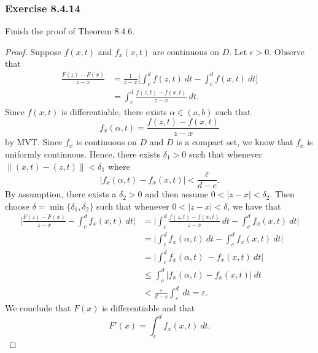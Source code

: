 \subsubsection{Exercise 8.4.14} Finish the proof of Theorem 8.4.6.
\begin{proof}
Suppose \( f(x,t)  \) and \( f_{x}(x,t)  \) are continuous on \( D  \). Let \( \epsilon > 0  \). Observe that 
\begin{align*}
    \frac{ F(z) - F(x)  }{ z - x  }   &=  \frac{ 1 }{ z - x  } \Big[   \int_{ c }^{ d }  f(z,t) \ dt - \int_{ c }^{ d } f(x,t) \ dt \Big]  \\
                 &= \int_{ c }^{ d }  \frac{ f(z,t) - f(x,t)  }{ z - x  }  \  dt.
\end{align*}  Since \( f(x,t)   \) is differentiable, there exists \( \alpha \in (a,b)  \) such that 
\[  f_{x}(\alpha , t ) = \frac{ f(z,t) - f(x,t)  }{ z - x } \] by MVT. Since \( f_x \) is continuous on \( D  \) and \( D  \) is a compact set, we know that \( f_{x} \) is uniformly continuous. Hence, there exists \( \delta_1 > 0  \) such that whenever \( \lVert (x,t) - (z,t)  \rVert < \delta_{1} \) where 
\[ | f_{x}(\alpha,t ) - f_{x}(x,t)  | < \frac{ \varepsilon }{ d -c   }.   \]  
By assumption, there exists a \(  \delta_2 > 0  \) and then assume \( 0 < | z  -x  | < \delta_2  \). Then choose \( \delta = \min \{ \delta_{1}, \delta_{2} \}  \) such that whenever \(  0 < | z - x  | < \delta  \), we have that 
\begin{align*}
   \Big| \frac{ F(z) - F(x)  }{  z - x  } - \int_{ c }^{ d } f_{x}(x,t)  \ dt  \Big|  &= \Big| \int_{ c }^{ d } \frac{ f(z,t) - f(x,t)   }{  z - x  } \ dt - \int_{ c }^{ d } f_{x}(x,t) \ dt \Big|  \\
                                                                                      &= \Big|  \int_{ c }^{ d } f_{x}(\alpha, t) \  dt - \int_{ c }^{ d } f_{x}(x,t) \  dt \Big|\\
                                                                                      &= \Big| \int_{ c }^{ d }  f_{x}(\alpha, t ) \  - f_{x}(x,t)  \ dt \Big| \\  
                                                                                      &\leq \int_{ c }^{ d }  | f_{x}(\alpha,t ) - f_{x}(x,t) | \  dt \\
                                                                                      &< \frac{ \varepsilon  }{ d -c   }  \int_{ c }^{ d }  \ dt = \varepsilon.
\end{align*}
We conclude that \( F(x)   \) is differentiable and that 
\[  F'(x) = \int_{ c }^{ d }  f_{x}(x,t) \ dt. \]
\end{proof}

